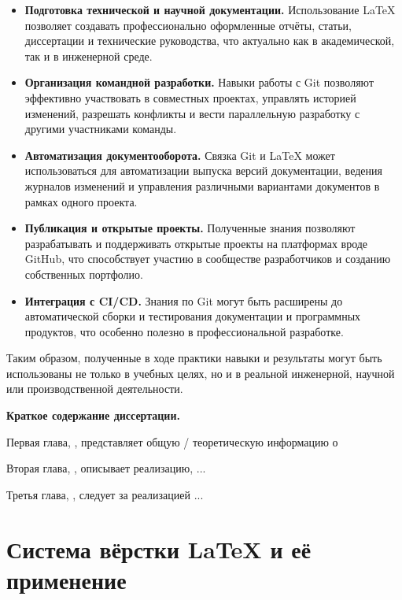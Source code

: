 \documentclass[a4paper,12pt]{report}
\begin{document}
\begin{itemize}
    \item \textbf{Подготовка технической и научной документации.} Использование \LaTeX{} позволяет создавать профессионально оформленные отчёты, статьи, диссертации и технические руководства, что актуально как в академической, так и в инженерной среде.
    
    \item \textbf{Организация командной разработки.} Навыки работы с Git позволяют эффективно участвовать в совместных проектах, управлять историей изменений, разрешать конфликты и вести параллельную разработку с другими участниками команды.
    
    \item \textbf{Автоматизация документооборота.} Связка Git и \LaTeX{} может использоваться для автоматизации выпуска версий документации, ведения журналов изменений и управления различными вариантами документов в рамках одного проекта.
    
    \item \textbf{Публикация и открытые проекты.} Полученные знания позволяют разрабатывать и поддерживать открытые проекты на платформах вроде GitHub, что способствует участию в сообществе разработчиков и созданию собственных портфолио.
    
    \item \textbf{Интеграция с CI/CD.} Знания по Git могут быть расширены до автоматической сборки и тестирования документации и программных продуктов, что особенно полезно в профессиональной разработке.
\end{itemize}

Таким образом, полученные в ходе практики навыки и результаты могут быть использованы не только в учебных целях, но и в реальной инженерной, научной или производственной деятельности.

\textbf{Краткое содержание диссертации.}

Первая глава, , представляет общую / теоретическую информацию о 

Вторая глава, , описывает реализацию, ...

Третья глава, , следует за реализацией ...

\chapter{Система вёрстки \LaTeX{} и её применение}\label{intro_chapter_title}
\end{document}
